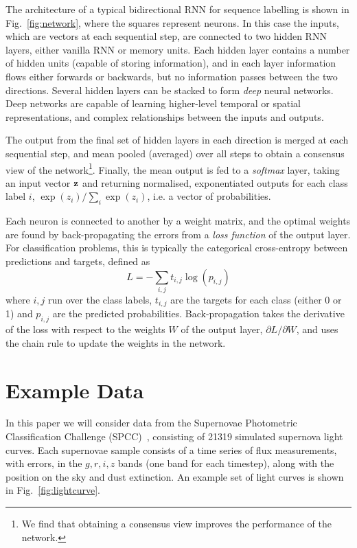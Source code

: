 \documentclass[twocolumn]{aastex61}
\begin{document}
The architecture of a typical bidirectional RNN for sequence labelling is shown in Fig.~\ref{fig:network}, where the squares represent {\rm neurons}. In this case the inputs, which are vectors at each sequential step, are connected to two hidden RNN layers, either vanilla RNN or memory units.  Each hidden layer contains a number of hidden units (capable of storing information), and in each layer information flows either forwards or backwards,  but no information passes between the two directions. Several hidden layers can be stacked to form {\em deep} neural networks. Deep networks are capable of learning higher-level temporal or spatial representations, and complex relationships between the inputs and outputs.

The output from the final set of hidden layers in each direction is merged at each sequential step, and mean pooled (averaged) over all steps to obtain a consensus view of the network\footnote{We find that obtaining a consensus view improves the performance of the network.}. Finally, the mean output is fed to a {\em softmax} layer, taking an input vector ${\bf z}$ and returning normalised, exponentiated outputs for each class label $i$, $\exp(z_i) / \sum_{i} \exp(z_i)$, i.e. a vector of probabilities.

 Each neuron is connected to another by a weight matrix, and the optimal weights are found by back-propagating the errors from a {\em loss function} of the output layer. For classification problems, this is typically the categorical cross-entropy between predictions and targets, defined as 
\begin{equation}
L= -\sum_{i,j} t_{i,j} \log \left( p_{i,j} \right)
\end{equation}
where $i,j$ run over the class labels, $t_{i,j}$ are the targets for each class (either 0 or 1) and $p_{i,j}$ are the predicted probabilities. Back-propagation takes the derivative of the loss with respect to the weights $W$ of the output layer, $\partial L/\partial W$, and uses the chain rule to update the weights in the network.

\section{Example Data}

In this paper we will consider data from the Supernovae Photometric Classification Challenge (SPCC)~\cite{Kessler:2010wk,Kessler:2010qj}, consisting of 21319 simulated supernova light curves.  Each supernovae sample consists of a time series of flux measurements, with errors, in the $g,r,i,z$ bands (one band for each timestep), along with the position on the sky and dust extinction. An example set of light curves is shown in Fig.~\ref{fig:lightcurve}. 
\end{document}

